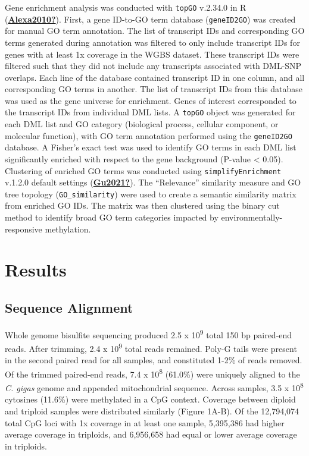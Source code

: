 \documentclass [11pt, proquest] {uwthesis}[2015/03/03]
\begin{document}
Gene enrichment analysis was conducted with \texttt{topGO} v.2.34.0 in R (\protect\hyperlink{ref-Alexa2010}{\textbf{Alexa2010?}}). First, a gene ID-to-GO term database (\texttt{geneID2GO}) was created for manual GO term annotation. The list of transcript IDs and corresponding GO terms generated during annotation was filtered to only include transcript IDs for genes with at least 1x coverage in the WGBS dataset. These transcript IDs were filtered such that they did not include any transcripts associated with DML-SNP overlaps. Each line of the database contained transcript ID in one column, and all corresponding GO terms in another. The list of transcript IDs from this database was used as the gene universe for enrichment. Genes of interest corresponded to the transcript IDs from individual DML lists. A \texttt{topGO} object was generated for each DML list and GO category (biological process, cellular component, or molecular function), with GO term annotation performed using the \texttt{geneID2GO} database. A Fisher's exact test was used to identify GO terms in each DML list significantly enriched with respect to the gene background (P-value \textless{} 0.05). Clustering of enriched GO terms was conducted using \texttt{simplifyEnrichment} v.1.2.0 default settings (\protect\hyperlink{ref-Gu2021}{\textbf{Gu2021?}}). The ``Relevance'' similarity measure and GO tree topology (\texttt{GO\_similarity}) were used to create a semantic similarity matrix from enriched GO IDs. The matrix was then clustered using the binary cut method to identify broad GO term categories impacted by environmentally-responsive methylation.

\hypertarget{results-3}{%
\section{Results}\label{results-3}}

\hypertarget{sequence-alignment-3}{%
\subsection{Sequence Alignment}\label{sequence-alignment-3}}

Whole genome bisulfite sequencing produced 2.5 x 10\textsuperscript{9} total 150 bp paired-end reads. After trimming, 2.4 x 10\textsuperscript{9} total reads remained. Poly-G tails were present in the second paired read for all samples, and constituted 1-2\% of reads removed. Of the trimmed paired-end reads, 7.4 x 10\textsuperscript{8} (61.0\%) were uniquely aligned to the \emph{C. gigas} genome and appended mitochondrial sequence. Across samples, 3.5 x 10\textsuperscript{8} cytosines (11.6\%) were methylated in a CpG context. Coverage between diploid and triploid samples were distributed similarly (Figure 1A-B). Of the 12,794,074 total CpG loci with 1x coverage in at least one sample, 5,395,386 had higher average coverage in triploids, and 6,956,658 had equal or lower average coverage in triploids.
\end{document}
